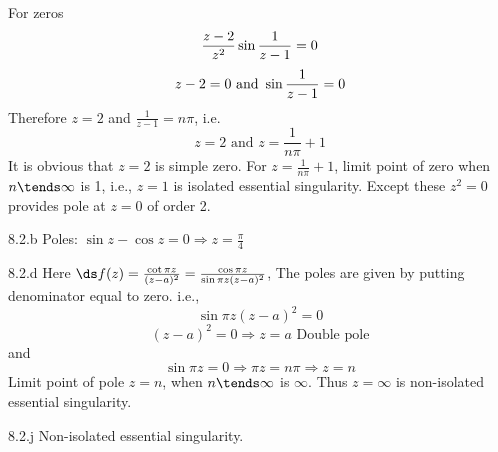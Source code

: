 \begin{Solution}{8.1}
	For zeros
	\[\frac{z-2}{z^2}\sin{1 \over z-1} = 0\]
	\[z-2 = 0 \text{ and } \sin{1 \over z-1} = 0\]
	Therefore $z=2$ and $\frac{1}{z-1}=n\pi$, i.e.
	\[z= 2 \text{ and } z=\frac{1}{n\pi}+1\]
	It is obvious that $z=2$ is simple zero. For $z=\frac{1}{n\pi}+1$, limit point of zero when $n\tends \infty$ is 1, i.e., $z=1$ is isolated essential singularity. Except these $z^2=0$ provides pole at $z=0$ of order 2.
	
\end{Solution}
\begin{Solution}{8.2.b}
	Poles: $\sin z - \cos z=0 \Rightarrow z=\frac{\pi}{4}$
	
\end{Solution}
\begin{Solution}{8.2.d}
	Here $\ds f(z)=\frac{\cot \pi z}{(z-a)^2}=\frac{\cos \pi z}{\sin \pi z(z-a)^2}$, The poles are given by putting denominator equal to zero. i.e.,
	\[\sin \pi z(z-a)^2 = 0\]
	\[(z-a)^2 = 0 \Rightarrow z=a \text{ Double pole}\]
	and
	\[\sin \pi z = 0 \Rightarrow \pi z = n\pi \Rightarrow z=n\]
	Limit point of pole $z=n$, when $n\tends \infty$ is $\infty$. Thus $z=\infty$ is non-isolated essential singularity.
	
\end{Solution}
\begin{Solution}{8.2.j}
	Non-isolated essential singularity.
	
\end{Solution}
